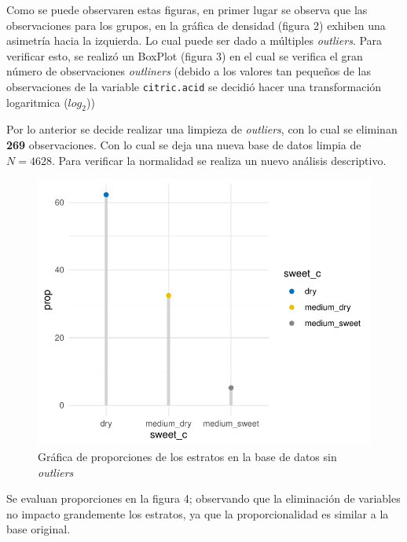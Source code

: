 \documentclass[
]{article}
\begin{document}
Como se puede observaren estas figuras, en primer lugar se observa que
las observaciones para los grupos, en la gráfica de densidad (figura 2)
exhiben una asimetría hacia la izquierda. Lo cual puede ser dado a
múltiples \emph{outliers}. Para verificar esto, se realizó un BoxPlot
(figura 3) en el cual se verifica el gran número de observaciones
\emph{outliners} (debido a los valores tan pequeños de las observaciones
de la variable \texttt{citric.acid} se decidió hacer una transformación
logaritmica (\(log_2\)))

Por lo anterior se decide realizar una limpieza de \emph{outliers}, con
lo cual se eliminan \textbf{269} observaciones. Con lo cual se deja una
nueva base de datos limpia de \(N = 4628\). Para verificar la normalidad
se realiza un nuevo análisis descriptivo.

\begin{figure}
\centering
\includegraphics{muestreo_estratificado_final_files/figure-latex/proportion tidy-1.pdf}
\caption{Gráfica de proporciones de los estratos en la base de datos sin
\emph{outliers}}
\end{figure}

Se evaluan proporciones en la figura 4; observando que la eliminación de
variables no impacto grandemente los estratos, ya que la
proporcionalidad es similar a la base original.
\end{document}

